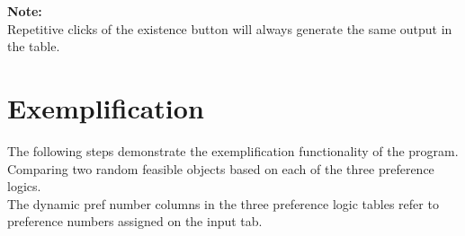 \documentclass[12pt]{report}
\begin{document}
\textbf{Note:} \\
Repetitive clicks of the existence button will always generate the same output in the table.

\newpage
\section{Exemplification}
\vspace{.75em}
The following steps demonstrate the exemplification functionality of the program. \\
Comparing two random feasible objects based on each of the three preference logics.\\
The dynamic pref number columns in the three preference logic tables refer to preference numbers assigned on the input tab.\\
\end{document}
